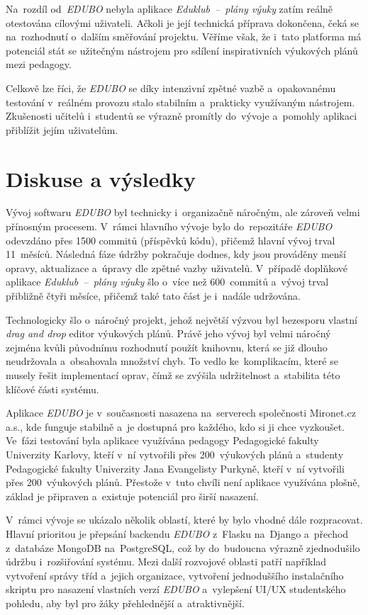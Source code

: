 \documentclass[male,czech,api_bc]{kitheses}
\begin{document}
Na~rozdíl od~\textit{EDUBO} nebyla aplikace \textit{Eduklub~--~plány výuky} zatím reálně otestována cílovými uživateli. Ačkoli je její technická příprava dokončena, čeká se na~rozhodnutí o~dalším směřování projektu. Věříme však, že i~tato platforma má potenciál stát se užitečným nástrojem pro sdílení inspirativních výukových plánů mezi pedagogy.

Celkově lze říci, že \textit{EDUBO} se díky intenzivní zpětné vazbě a~opakovanému testování v~reálném provozu stalo stabilním a~prakticky využívaným nástrojem. Zkušenosti učitelů i~studentů se výrazně promítly do~vývoje a~pomohly aplikaci přiblížit jejím uživatelům.


\chapter{Diskuse a výsledky}

Vývoj softwaru \textit{EDUBO} byl technicky i~organizačně náročným, ale zároveň velmi přínosným procesem. V~rámci hlavního vývoje bylo do~repozitáře \textit{EDUBO} odevzdáno přes 1500 commitů (příspěvků kódu), přičemž hlavní vývoj trval 11~měsíců. Následná fáze údržby pokračuje dodnes, kdy jsou prováděny menší opravy, aktualizace a~úpravy dle zpětné vazby uživatelů. V~případě doplňkové aplikace \textit{Eduklub~--~plány výuky} šlo o~více než 600~commitů a~vývoj trval přibližně čtyři měsíce, přičemž také tato část je i~nadále udržována.

Technologicky šlo o~náročný projekt, jehož největší výzvou byl bezesporu vlastní \textit{drag and drop} editor výukových plánů. Právě jeho vývoj byl velmi náročný zejména kvůli původnímu rozhodnutí použít knihovnu, která se již dlouho neudržovala a~obsahovala množství chyb. To vedlo ke~komplikacím, které se musely řešit implementací oprav, čímž se zvýšila udržitelnost a~stabilita této klíčové části systému.

Aplikace \textit{EDUBO} je v~současnosti nasazena na~serverech společnosti Mironet.cz a.s., kde funguje stabilně a~je dostupná pro každého, kdo si ji chce vyzkoušet. Ve~fázi testování byla aplikace využívána pedagogy Pedagogické fakulty Univerzity Karlovy, kteří v~ní vytvořili přes 200~výukových plánů a~studenty Pedagogické fakulty Univerzity Jana Evangelisty Purkyně, kteří v~ní vytvořili přes 200~výukových plánů. Přestože v~tuto chvíli není aplikace využívána plošně, základ je připraven a~existuje potenciál pro širší nasazení.

V~rámci vývoje se ukázalo několik oblastí, které by bylo vhodné dále rozpracovat. Hlavní prioritou je přepsání backendu \textit{EDUBO} z~Flasku na~Django a~přechod z~databáze MongoDB na~PostgreSQL, což by do~budoucna výrazně zjednodušilo údržbu i~rozšiřování systému. Mezi další rozvojové oblasti patří například vytvoření správy tříd a~jejich organizace, vytvoření jednoduššího instalačního skriptu pro nasazení vlastních verzí \textit{EDUBO} a~vylepšení UI/UX studentského pohledu, aby byl pro žáky přehlednější a~atraktivnější.
\end{document}
